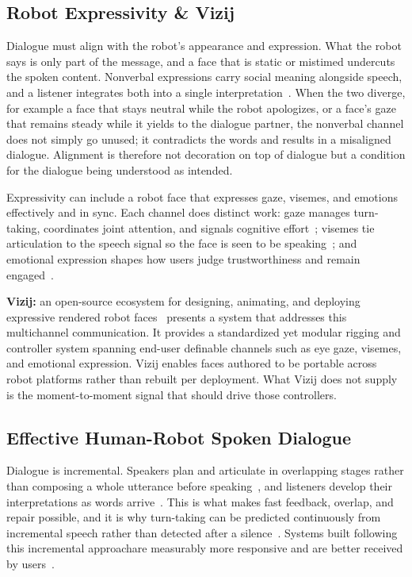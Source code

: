 \subsection{Robot Expressivity \& Vizij}

Dialogue must align with the robot's appearance and expression. What the
robot says is only part of the message, and a face that is static or mistimed
undercuts the spoken content. Nonverbal expressions carry social meaning
alongside speech, and a listener integrates both into a single
interpretation~\cite{urakami2023nonverbal, admoni2017social}. When the two
diverge, for example a face that stays neutral while the robot apologizes, or a face's gaze that remains steady while it yields to the dialogue partner, the nonverbal channel does not simply go unused; it contradicts the words and results in a misaligned dialogue. Alignment is therefore not decoration on top of dialogue but a condition for the dialogue being understood as intended.

Expressivity can include a robot face that expresses gaze, visemes, and
emotions effectively and in sync. Each channel does distinct work: gaze
manages turn-taking, coordinates joint attention, and signals cognitive
effort~\cite{mishra2023gaze}; visemes tie articulation to the speech signal so
the face is seen to be speaking~\cite{edwards2016jali}; and emotional expression shapes how users judge trustworthiness and remain engaged~\cite{song2023robot}.



\textbf{Vizij:} an open-source ecosystem for designing, animating, and
deploying expressive rendered robot faces~\cite{elbeleidy2026vizij} presents a system that addresses this multichannel communication. It
provides a standardized yet modular rigging and controller system spanning
end-user definable channels such as eye gaze, visemes, and emotional
expression. Vizij enables faces authored to be portable across robot platforms
rather than rebuilt per deployment. What Vizij does not supply is the
moment-to-moment signal that should drive those controllers.

\subsection{Effective Human-Robot Spoken Dialogue}

Dialogue is incremental. Speakers plan and articulate in overlapping stages
rather than composing a whole utterance before speaking~\cite{levelt1989speaking},
and listeners develop their interpretations as words arrive~\cite{tanenhaus1995integration}. This is what
makes fast feedback, overlap, and repair possible, and it is why turn-taking
can be predicted continuously from incremental speech rather than
detected after a silence~\cite{skantze2021review, ekstedt2022vap}. Systems
built following this incremental approachare measurably more responsive and are better
received by users~\cite{baumann2011evaluation, kohn2018incremental}.

